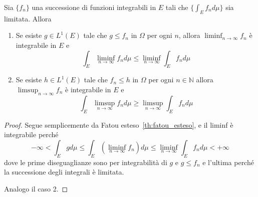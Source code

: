 \begin{lemmao}\label{thm:fatou}
    Sia \(\{f_{n}\} \) una successione di funzioni integrabili in \(E\) tali che
    \(\{\int_E f_{n} d\mu\} \) sia limitata. Allora
\begin{enumerate}[label = \arabic*.]
    \item Se esiste \(g \in L^{1}{(E)}\) tale che \(g \le f_{n}\) in \(\Omega\)
        per ogni \(n\), allora \(\liminf_{n \to \infty} f_{n}\) è integrabile in
        \(E\) e
        \[
            \int_E \liminf_{n \to \infty} f_{n} d\mu \le \liminf_{n \to \infty}
            \int_E f_{n} d\mu
        \]
    \item Se esiste \(h \in L^{1}{(E)}\) tale che \(f_{n} \le h\) in \(\Omega\)
        per ogni \(n \in \mathbb{N}\) allora \(\limsup_{n \to \infty} f_{n}\) è
        integrabile in \(E\) e
        \[
            \int_E \limsup_{n \to \infty} f_{n} d\mu \ge \limsup_{n \to \infty}
            \int_E f_{n} d\mu
        \]
\end{enumerate}
\end{lemmao}
\begin{proof}
    Segue semplicemente da Fatou esteso~\ref{th:fatou_esteso}, e il liminf è
    integrabile perché 
    \[
        -\infty < \int_E g d\mu \le \int_E{\left( \liminf_{n \to \infty} f_{n}
        \right)} d\mu \le \liminf_{n \to \infty} \int_E f_{n} d\mu < +\infty
    \]
    dove le prime diseguaglianze sono per integrabilità di \(g\) e \(g
    \le f_{n}\) e l'ultima perché la successione degli integrali è limitata.

    Analogo il caso 2.
\end{proof}

